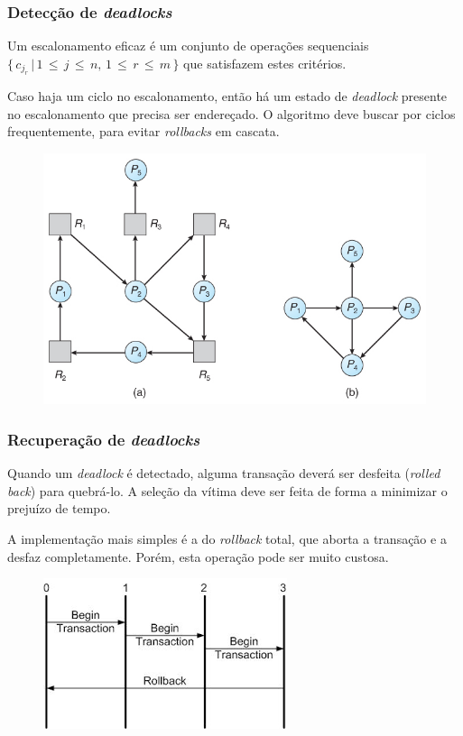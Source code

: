 \documentclass{beamer}
\begin{document}
\begin{frame} %
    \frametitle{Detecção de \emph{deadlocks}}
    \begin{theorem}

        Um escalonamento eficaz é um conjunto de operações sequenciais \(\{\, c_{j_{r}} \, | \, 1 \, \leq \, j \, \leq \, n, \, 1 \, \leq \, r \, \leq \, m\, \}\) que satisfazem estes critérios.

        \medskip
        Caso haja um ciclo no escalonamento, então há um estado de \emph{deadlock} presente no escalonamento que precisa ser endereçado. O algoritmo deve buscar por ciclos frequentemente, para evitar \emph{rollbacks} em cascata.

    \end{theorem}

    \begin{figure}
        \includegraphics[width=0.5\linewidth]{deadlockdetection1.jpg}
    \end{figure}
\end{frame}



\begin{frame} %
    \frametitle{Recuperação de \emph{deadlocks}}

    Quando um \emph{deadlock} é detectado, alguma transação deverá ser desfeita (\emph{rolled back}) para quebrá-lo. A seleção da vítima deve ser feita de forma a minimizar o prejuízo de tempo.

    \medskip
    A implementação mais simples é a do \emph{rollback} total, que aborta a transação e a desfaz completamente. Porém, esta operação pode ser muito custosa.

    \begin{figure}
        \includegraphics[width=0.5\linewidth]{completerollback.png}
    \end{figure}

\end{frame}
\end{document}
